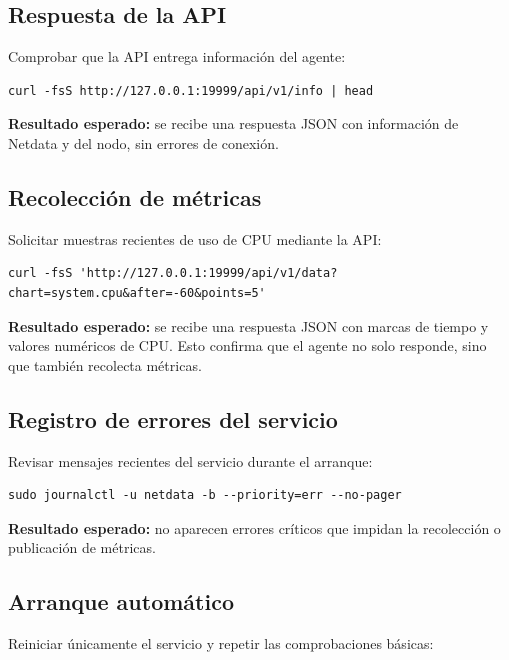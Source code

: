 \subsection{Respuesta de la API}

Comprobar que la API entrega información del agente:

\begin{lstlisting}[style=terminal]
curl -fsS http://127.0.0.1:19999/api/v1/info | head
\end{lstlisting}

\textbf{Resultado esperado:} se recibe una respuesta JSON con información de
Netdata y del nodo, sin errores de conexión.

\subsection{Recolección de métricas}

Solicitar muestras recientes de uso de CPU mediante la API:

\begin{lstlisting}[style=terminal]
curl -fsS 'http://127.0.0.1:19999/api/v1/data?chart=system.cpu&after=-60&points=5'
\end{lstlisting}

\textbf{Resultado esperado:} se recibe una respuesta JSON con marcas de tiempo
y valores numéricos de CPU. Esto confirma que el agente no solo responde, sino
que también recolecta métricas.

\subsection{Registro de errores del servicio}

Revisar mensajes recientes del servicio durante el arranque:

\begin{lstlisting}[style=terminal]
sudo journalctl -u netdata -b --priority=err --no-pager
\end{lstlisting}

\textbf{Resultado esperado:} no aparecen errores críticos que impidan la
recolección o publicación de métricas.

\subsection{Arranque automático}

Reiniciar únicamente el servicio y repetir las comprobaciones básicas:

